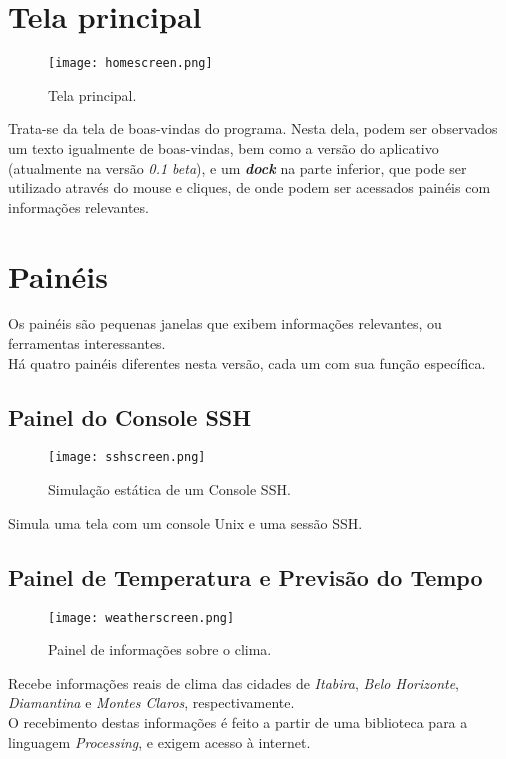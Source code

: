 \documentclass[oneside,a4paper]{abntex2}       %
\begin{document}
\section{Tela principal}
\begin{figure}[H]
\centering
\texttt{[image: homescreen.png]}
\caption{Tela principal.}
\end{figure}

Trata-se da tela de boas-vindas do programa. Nesta dela, podem ser observados um texto igualmente de boas-vindas, bem como a versão do aplicativo (atualmente na versão \textit{0.1 beta}), e um \textbf{\textit{dock}} na parte inferior, que pode ser utilizado através do mouse e cliques, de onde podem ser acessados painéis com informações relevantes.

\section{Painéis}
Os painéis são pequenas janelas que exibem informações relevantes, ou ferramentas interessantes.\\
Há quatro painéis diferentes nesta versão, cada um com sua função específica.

\subsection{Painel do Console SSH}
\begin{figure}[H]
\centering
\texttt{[image: sshscreen.png]}
\caption{Simulação estática de um Console SSH.}
\end{figure}

Simula uma tela com um console Unix e uma sessão SSH.

\subsection{Painel de Temperatura e Previsão do Tempo}
\begin{figure}[H]
\centering
\texttt{[image: weatherscreen.png]}
\caption{Painel de informações sobre o clima.}
\end{figure}

Recebe informações reais de clima das cidades de \textit{Itabira}, \textit{Belo Horizonte}, \textit{Diamantina} e \textit{Montes Claros}, respectivamente.\\
O recebimento destas informações é feito a partir de uma biblioteca para a linguagem \textit{Processing}, e exigem acesso à internet.
\end{document}
